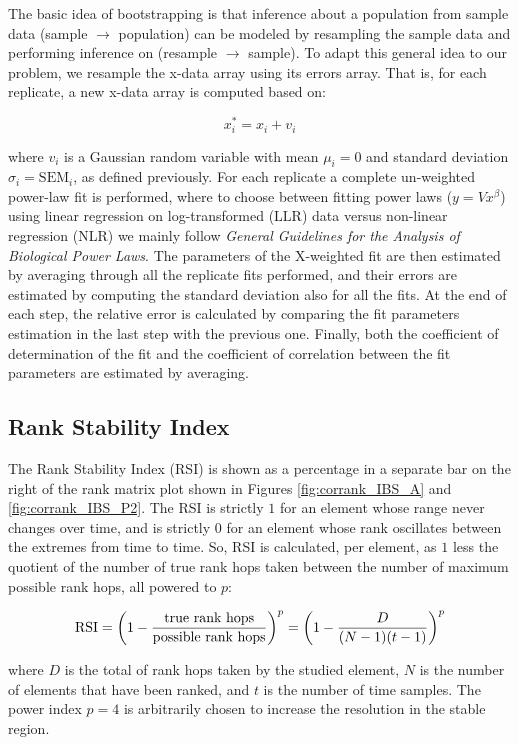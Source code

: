 The basic idea of bootstrapping is that inference about a population from sample data (sample $\rightarrow$ population) can be modeled by resampling the sample data and performing inference on (resample $\rightarrow$ sample)\cite{boot}. To adapt this general idea to our problem, we resample the x-data array using its errors array. That is, for each replicate, a new x-data array is computed based on:
\begin{linenomath}
$$x^*_i = x_i + v_i$$
\end{linenomath}
where $v_i$ is a Gaussian random variable with mean $\mu_i=0$ and standard deviation $\sigma_i=\mathrm{SEM}_i$, as defined previously. For each replicate a complete un-weighted power-law fit is performed, where to choose between fitting power laws ($y=Vx^\beta$) using linear regression on log-transformed (LLR) data versus non-linear regression (NLR) we mainly follow \emph{General Guidelines for the Analysis of Biological Power Laws}\cite{biopwrlaw}. The parameters of the X-weighted fit are then estimated by averaging through all the replicate fits performed, and their errors are estimated by computing the standard deviation also for all the fits. At the end of each step, the relative error is calculated by comparing the fit parameters estimation in the last step with the previous one. Finally, both the coefficient of determination of the fit and the coefficient of correlation between the fit parameters are estimated by averaging.

\subsection*{Rank Stability Index}\label{sec:RSI}

The Rank Stability Index (RSI) is shown as a percentage in a separate bar on the right of the rank matrix plot shown in Figures \ref{fig:corrank_IBS_A} and \ref{fig:corrank_IBS_P2}. The RSI is strictly $1$ for an element whose range never changes over time, and is strictly $0$ for an element whose rank oscillates between the extremes from time to time. So, RSI is calculated, per element, as $1$ less the quotient of the number of true rank hops taken between the number of maximum possible rank hops, all powered to $p$:
\begin{linenomath}
$${\rm RSI} = \left(1-\frac{\text{true rank hops}}{\text{possible rank hops}}\right)^p = \left(1-\frac{D}{(N-1)(t-1)}\right)^p$$
\end{linenomath}
where $D$ is the total of rank hops taken by the studied element, $N$ is the number of elements that have been ranked, and $t$ is the number of time samples. The power index $p=4$ is arbitrarily chosen to increase the resolution in the stable region. 

